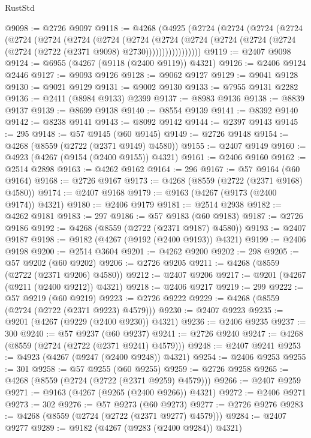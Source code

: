 \begin{lexlean}{RustStd}
\begin{coremodule}
@9098 := @2726 @9097
@9118 := @4268
    (@4925
      (@2724
        (@2724
          (@2724
            (@2724
              (@2724
                (@2724
                  (@2724
                    (@2724
                      (@2724
                        (@2724
                          (@2724
                            (@2724 (@2724 (@2724 (@2724 (@2722 (@2371 @9098) @2730)))))))))))))))))
@9119 := @2407 @9098
@9124 := @6955 (@4267 (@9118 (@2400 @9119)) @4321)
@9126 := @2406 @9124 @2446
@9127 := @9093 @9126
@9128 := @9062 @9127
@9129 := @9041 @9128
@9130 := @9021 @9129
@9131 := @9002 @9130
@9133 := @7955 @9131 @2282
@9136 := @2411 (@8984 @9133) @2399
@9137 := @8983 @9136
@9138 := @8839 @9137
@9139 := @8699 @9138
@9140 := @8554 @9139
@9141 := @8392 @9140
@9142 := @8238 @9141
@9143 := @8092 @9142
@9144 := @2397 @9143
@9145 := 295
@9148 := @57 @9145 (@60 @9145)
@9149 := @2726 @9148
@9154 := @4268 (@8559 (@2722 (@2371 @9149) @4580))
@9155 := @2407 @9149
@9160 := @4923 (@4267 (@9154 (@2400 @9155)) @4321)
@9161 := @2406 @9160
@9162 := @2514 @2898
@9163 := @4262 @9162
@9164 := 296
@9167 := @57 @9164 (@60 @9164)
@9168 := @2726 @9167
@9173 := @4268 (@8559 (@2722 (@2371 @9168) @4580))
@9174 := @2407 @9168
@9179 := @9163 (@4267 (@9173 (@2400 @9174)) @4321)
@9180 := @2406 @9179
@9181 := @2514 @2938
@9182 := @4262 @9181
@9183 := 297
@9186 := @57 @9183 (@60 @9183)
@9187 := @2726 @9186
@9192 := @4268 (@8559 (@2722 (@2371 @9187) @4580))
@9193 := @2407 @9187
@9198 := @9182 (@4267 (@9192 (@2400 @9193)) @4321)
@9199 := @2406 @9198
@9200 := @2514 @3604
@9201 := @4262 @9200
@9202 := 298
@9205 := @57 @9202 (@60 @9202)
@9206 := @2726 @9205
@9211 := @4268 (@8559 (@2722 (@2371 @9206) @4580))
@9212 := @2407 @9206
@9217 := @9201 (@4267 (@9211 (@2400 @9212)) @4321)
@9218 := @2406 @9217
@9219 := 299
@9222 := @57 @9219 (@60 @9219)
@9223 := @2726 @9222
@9229 := @4268 (@8559 (@2724 (@2722 (@2371 @9223) @4579)))
@9230 := @2407 @9223
@9235 := @9201 (@4267 (@9229 (@2400 @9230)) @4321)
@9236 := @2406 @9235
@9237 := 300
@9240 := @57 @9237 (@60 @9237)
@9241 := @2726 @9240
@9247 := @4268 (@8559 (@2724 (@2722 (@2371 @9241) @4579)))
@9248 := @2407 @9241
@9253 := @4923 (@4267 (@9247 (@2400 @9248)) @4321)
@9254 := @2406 @9253
@9255 := 301
@9258 := @57 @9255 (@60 @9255)
@9259 := @2726 @9258
@9265 := @4268 (@8559 (@2724 (@2722 (@2371 @9259) @4579)))
@9266 := @2407 @9259
@9271 := @9163 (@4267 (@9265 (@2400 @9266)) @4321)
@9272 := @2406 @9271
@9273 := 302
@9276 := @57 @9273 (@60 @9273)
@9277 := @2726 @9276
@9283 := @4268 (@8559 (@2724 (@2722 (@2371 @9277) @4579)))
@9284 := @2407 @9277
@9289 := @9182 (@4267 (@9283 (@2400 @9284)) @4321)

\end{coremodule}
\end{lexlean}
